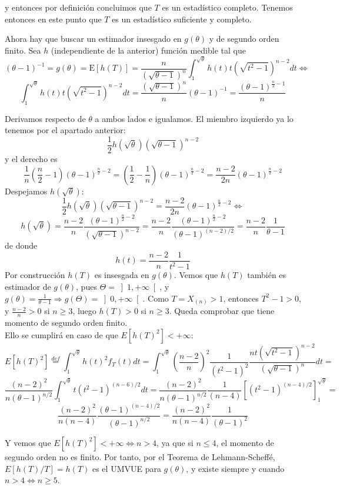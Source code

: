 \documentclass[12pt]{article}
\newcommand{\E}{\mathrm{E}}
\begin{document}
\begin{ejercicio}[1.9 puntos]
        y entonces por definición concluimos que $T$ es un estadístico completo. Tenemos entonces en este punto
        que $T$ es un estadístico suficiente y completo. 

        \newpage

        Ahora hay que buscar un estimador insesgado en $g(\theta)$ y de segundo orden finito. Sea $h$ (independiente de la anterior) función medible tal que
        $$(\theta-1)^{-1} = g(\theta) = \E[h(T)] = \dfrac{n}{(\sqrt{\theta-1})^{n}} \int_{1}^{\sqrt{\theta}} h(t) t(\sqrt{t^2-1})^{n-2} dt \iff$$
        $$\int_{1}^{\sqrt{\theta}} h(t) t(\sqrt{t^2-1})^{n-2} dt = \dfrac{(\sqrt{\theta-1})^{n}}{n} (\theta-1)^{-1} = \dfrac{(\theta-1)^{\frac{n}{2}-1}}{n} $$

        Derivamos respecto de $\theta$ a ambos lados e igualamos. El miembro izquierdo ya lo tenemos por el apartado anterior:
        $$\dfrac{1}{2} h(\sqrt{\theta}) (\sqrt{\theta-1})^{n-2}$$
        y el derecho es 
        $$\dfrac{1}{n}\left( \dfrac{n}{2} - 1 \right)(\theta-1)^{\frac{n}{2}-2} = \left( \dfrac{1}{2} - \dfrac{1}{n} \right) (\theta-1)^{\frac{n}{2}-2} = \dfrac{n-2}{2n} (\theta-1)^{\frac{n}{2}-2}$$
        Despejamos $h(\sqrt{\theta})$:
        $$\dfrac{1}{2} h(\sqrt{\theta}) (\sqrt{\theta-1})^{n-2} = \dfrac{n-2}{2n} (\theta-1)^{\frac{n}{2}-2} \iff $$
        $$h(\sqrt{\theta}) = \dfrac{n-2}{n} \dfrac{(\theta-1)^{\frac{n}{2}-2}}{(\sqrt{\theta-1})^{n-2}} = 
        \dfrac{n-2}{n} \dfrac{(\theta-1)^{\frac{n}{2}-2}}{(\theta-1)^{(n-2)/2}} = \dfrac{n-2}{n} \dfrac{1}{\theta-1}$$
        de donde
        $$h(t) = \dfrac{n-2}{n} \dfrac{1}{t^2-1}$$
        Por construcción $h(T)$ es insesgada en $g(\theta)$. Vemos que $h(T)$ también es estimador de $g(\theta)$, 
        pues $\Theta = \left] 1, +\infty \right[$, y $g(\theta) = \frac{1}{\theta-1} \Longrightarrow g(\Theta) = \left]0,+\infty \right[$. 
        Como $T = X_{(n)} > 1$, entonces $T^2 - 1 > 0$, y $\frac{n-2}{n} > 0$ si $n \geq 3$, luego $h(T) > 0$ si $n \geq 3$. Queda comprobar que tiene momento de segundo orden finito. \\

        Ello se cumplirá en caso de que $E[h(T)^2] < + \infty$:
        $$E[h(T)^2] \stackrel{def}{=} \int_{1}^{\sqrt{\theta}} h(t)^2 f_T(t) dt = \int_{1}^{\sqrt{\theta}} 
        \left( \dfrac{n-2}{n} \right)^2 \dfrac{1}{(t^2-1)^2} \dfrac{nt(\sqrt{t^2-1})^{n-2}}{(\sqrt{\theta-1})^{n}} dt = $$
        $$\dfrac{(n-2)^2}{n(\theta-1)^{n/2}} \int_{1}^{\sqrt{\theta}} t(t^2-1)^{(n-6)/2}dt = 
        \dfrac{(n-2)^2}{n(\theta-1)^{n/2}} \dfrac{1}{(n-4)} \left[(t^2-1)^{(n-4)/2} \right]_1^{\sqrt{\theta}} = $$
        $$\dfrac{(n-2)^2}{n(n-4)} \dfrac{(\theta-1)^{(n-4)/2}}{(\theta-1)^{n/2}} = \dfrac{(n-2)^2}{n(n-4)} \dfrac{1}{(\theta-1)^2}$$

        Y vemos que $E[h(T)^2] < + \infty \iff n > 4$, ya que si $n \leq 4$, el momento de segundo orden no es finito.
        Por tanto, por el Teorema de Lehmann-Scheffé, $E[h(T)/T] = h(T)$ es el UMVUE para $g(\theta)$, y existe siempre y
        cuando $n>4 \iff n \geq 5$.
    \end{ejercicio}
\end{document}
